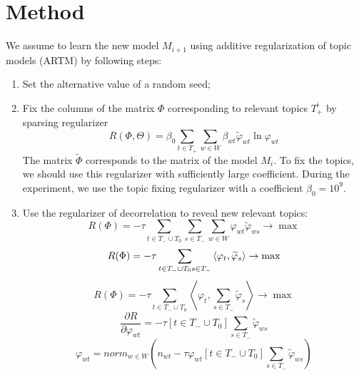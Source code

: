 \documentclass{article}
\begin{document}
\section{Method}

We assume to learn the new model $M_{i + 1}$ using additive regularization of topic models (ARTM) by following steps:

\begin{enumerate}
    \item Set the alternative value of a random seed;
    \item Fix the columns of the matrix $\Phi$ corresponding to relevant topics $T_+^i$ by sparsing regularizer \citep{SukVor19}
    \begin{equation}
        R (\Phi, \Theta) = \beta_0 \sum \limits_{t \in T_+} \sum \limits_{w \in W} \beta_{wt} \widetilde{\varphi}_{wt} \ln \varphi_{wt}
    \end{equation}
    The matrix $\widetilde{\Phi}$ corresponds to the matrix of the model $M_i$. To fix the topics, we should use this regularizer with sufficiently large coefficient. During the experiment, we use the topic fixing regularizer with a coefficient $\beta_0 = {10}^9$.
    \item Use the regularizer of decorrelation to reveal new relevant topics:
    \begin{equation}
        R(\Phi) = -\tau \sum \limits_{t \in T_- \cup T_0} \sum \limits_{s \in T_-} \sum \limits_{w \in W} \varphi_{wt} \widetilde{\varphi}_{ws} \to \max
    \end{equation}
    \begin{equation}
        R(\Phi) = -\tau \sum \limits_{t \in T_- \cup T_0 \\ s \in T_-} \left\langle \varphi_t, \widetilde{\varphi}_s \right\rangle \to \max
    \end{equation}
    \begin{equation}
        R(\Phi) = -\tau \sum \limits_{t \in T_- \cup T_0} \left\langle \varphi_t, \sum \limits_{s \in T_-} \widetilde{\varphi}_s \right\rangle \to \max
    \end{equation}
    \begin{equation}
        \frac{\partial R}{\partial \varphi_{wt}} = -\tau [t \in T_- \cup T_0] \sum \limits_{s \in T_-} \widetilde{\varphi}_{ws}
    \end{equation}
    \begin{equation}
        \varphi_{wt} = {norm}_{w \in W} \left(n_{wt} - \tau \varphi_{wt} [t \in T_- \cup T_0] \sum \limits_{s \in T_-} \widetilde{\varphi}_{ws}\right)
    \end{equation}
\end{enumerate}
\end{document}
